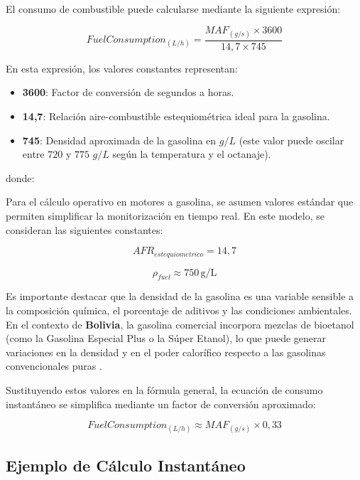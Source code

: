 El consumo de combustible puede calcularse mediante la siguiente expresión:

\begin{equation}
	FuelConsumption_{(L/h)} = \frac{MAF_{(g/s)} \times 3600}{14{,}7 \times 745}
\end{equation}

En esta expresión, los valores constantes representan:
\begin{itemize}
	\item \textbf{3600}: Factor de conversión de segundos a horas.
	\item \textbf{14,7}: Relación aire-combustible estequiométrica ideal para la gasolina.
	\item \textbf{745}: Densidad aproximada de la gasolina en $g/L$ (este valor puede oscilar entre $720$ y $775$ $g/L$ según la temperatura y el octanaje).
\end{itemize}

donde:

Para el cálculo operativo en motores a gasolina, se asumen valores estándar que permiten simplificar la monitorización en tiempo real. En este modelo, se consideran las siguientes constantes:

\begin{equation}
	AFR_{estequiometrico} = 14{,}7
\end{equation}

\begin{equation}
	\rho_{fuel} \approx 750 \, \mathrm{g/L}
\end{equation}

Es importante destacar que la densidad de la gasolina es una variable sensible a la composición química, el porcentaje de aditivos y las condiciones ambientales. En el contexto de \textbf{Bolivia}, la gasolina comercial incorpora mezclas de bioetanol (como la Gasolina Especial Plus o la Súper Etanol), lo que puede generar variaciones en la densidad y en el poder calorífico respecto a las gasolinas convencionales puras \citep{ANH_Gasolina_87}.

Sustituyendo estos valores en la fórmula general, la ecuación de consumo instantáneo se simplifica mediante un factor de conversión aproximado:

\begin{equation}
	FuelConsumption_{(L/h)} \approx MAF_{(g/s)} \times 0{,}33
\end{equation}

\subsection{Ejemplo de Cálculo Instantáneo}


